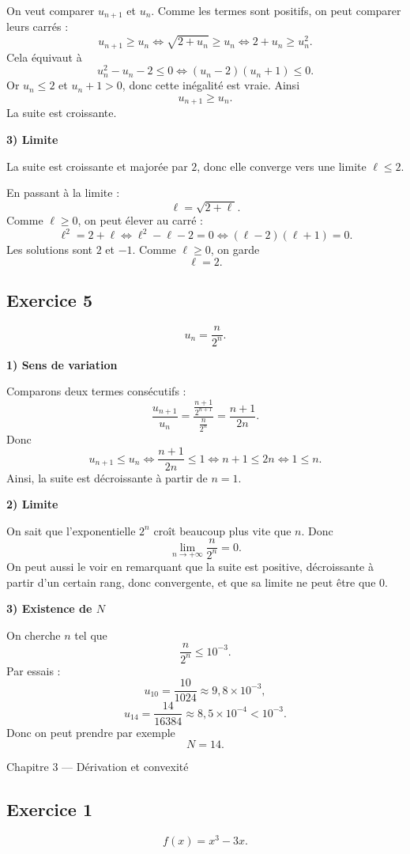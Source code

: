 \documentclass[11pt,a4paper]{article}
\begin{document}
On veut comparer \(u_{n+1}\) et \(u_n\).  
Comme les termes sont positifs, on peut comparer leurs carrés :
\[
u_{n+1}\geq u_n
\iff \sqrt{2+u_n}\geq u_n
\iff 2+u_n\geq u_n^2.
\]
Cela équivaut à
\[
u_n^2-u_n-2\leq 0
\iff (u_n-2)(u_n+1)\leq 0.
\]
Or \(u_n\leq 2\) et \(u_n+1>0\), donc cette inégalité est vraie. Ainsi
\[
u_{n+1}\geq u_n.
\]
La suite est croissante.

\textbf{3) Limite}

La suite est croissante et majorée par \(2\), donc elle converge vers une limite \(\ell\leq 2\).

En passant à la limite :
\[
\ell=\sqrt{2+\ell}.
\]
Comme \(\ell\geq 0\), on peut élever au carré :
\[
\ell^2=2+\ell
\iff \ell^2-\ell-2=0
\iff (\ell-2)(\ell+1)=0.
\]
Les solutions sont \(2\) et \(-1\). Comme \(\ell\geq 0\), on garde
\[
\boxed{\ell=2.}
\]

\subsection*{Exercice 5}
\[
u_n=\frac{n}{2^n}.
\]

\textbf{1) Sens de variation}

Comparons deux termes consécutifs :
\[
\frac{u_{n+1}}{u_n}
=\frac{\frac{n+1}{2^{n+1}}}{\frac{n}{2^n}}
=\frac{n+1}{2n}.
\]
Donc
\[
u_{n+1}\leq u_n \iff \frac{n+1}{2n}\leq 1
\iff n+1\leq 2n
\iff 1\leq n.
\]
Ainsi, la suite est décroissante à partir de \(n=1\).

\textbf{2) Limite}

On sait que l'exponentielle \(2^n\) croît beaucoup plus vite que \(n\). Donc
\[
\lim_{n\to+\infty}\frac{n}{2^n}=0.
\]
On peut aussi le voir en remarquant que la suite est positive, décroissante à partir d'un certain rang, donc convergente, et que sa limite ne peut être que \(0\).

\textbf{3) Existence de \(N\)}

On cherche \(n\) tel que
\[
\frac{n}{2^n}\leq 10^{-3}.
\]
Par essais :
\[
u_{10}=\frac{10}{1024}\approx 9{,}8\times 10^{-3},
\]
\[
u_{14}=\frac{14}{16384}\approx 8{,}5\times 10^{-4}<10^{-3}.
\]
Donc on peut prendre par exemple
\[
\boxed{N=14.}
\]

\begin{chapitrebox}{Chapitre 3 --- Dérivation et convexité}
\end{chapitrebox}

\subsection*{Exercice 1}
\[
f(x)=x^3-3x.
\]
\end{document}
